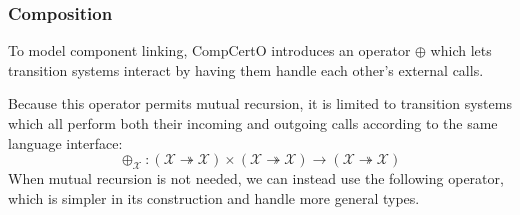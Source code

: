 \documentclass[acmsmall,review,anonymous]{acmart}\settopmatter{printfolios=true,printccs=false,printacmref=false}
\newcommand{\ISpec}{\mathbf{ISpec}}
\begin{document}
\subsubsection{Composition} %

To model component linking,
CompCertO introduces an operator $\oplus$
which lets transition systems interact
by having them handle each other's external calls.

Because this operator permits mutual recursion,
it is limited to transition systems which all perform
both their incoming and outgoing calls
according to the same language interface:
\[
  {\oplus_\mathcal{X}} :
    (\mathcal{X} \twoheadrightarrow \mathcal{X}) \times
    (\mathcal{X} \twoheadrightarrow \mathcal{X}) \rightarrow
    (\mathcal{X} \twoheadrightarrow \mathcal{X})
\]
When mutual recursion is not needed,
we can instead use the following operator,
which is simpler in its construction
and handle more general types.

\end{document}
